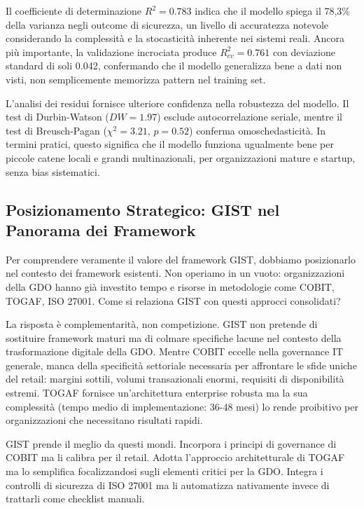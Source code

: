 Il coefficiente di determinazione $R^2 = 0.783$ indica che il modello spiega il 78,3\% della varianza negli outcome di sicurezza, un livello di accuratezza notevole considerando la complessità e la stocasticità inherente nei sistemi reali. Ancora più importante, la validazione incrociata produce $R^2_{cv} = 0.761$ con deviazione standard di soli 0.042, confermando che il modello generalizza bene a dati non visti, non semplicemente memorizza pattern nel training set.

L'analisi dei residui fornisce ulteriore confidenza nella robustezza del modello. Il test di Durbin-Watson ($DW = 1.97$) esclude autocorrelazione seriale, mentre il test di Breusch-Pagan ($\chi^2 = 3.21$, $p = 0.52$) conferma omoschedasticità. In termini pratici, questo significa che il modello funziona ugualmente bene per piccole catene locali e grandi multinazionali, per organizzazioni mature e startup, senza bias sistematici.

\subsection{Posizionamento Strategico: GIST nel Panorama dei Framework}

Per comprendere veramente il valore del framework GIST, dobbiamo posizionarlo nel contesto dei framework esistenti. Non operiamo in un vuoto: organizzazioni della GDO hanno già investito tempo e risorse in metodologie come COBIT, TOGAF, ISO 27001. Come si relaziona GIST con questi approcci consolidati?

La risposta è complementarità, non competizione. GIST non pretende di sostituire framework maturi ma di colmare specifiche lacune nel contesto della trasformazione digitale della GDO. Mentre COBIT eccelle nella governance IT generale, manca della specificità settoriale necessaria per affrontare le sfide uniche del retail: margini sottili, volumi transazionali enormi, requisiti di disponibilità estremi. TOGAF fornisce un'architettura enterprise robusta ma la sua complessità (tempo medio di implementazione: 36-48 mesi) lo rende proibitivo per organizzazioni che necessitano risultati rapidi.

GIST prende il meglio da questi mondi. Incorpora i principi di governance di COBIT ma li calibra per il retail. Adotta l'approccio architetturale di TOGAF ma lo semplifica focalizzandosi sugli elementi critici per la GDO. Integra i controlli di sicurezza di ISO 27001 ma li automatizza nativamente invece di trattarli come checklist manuali.

